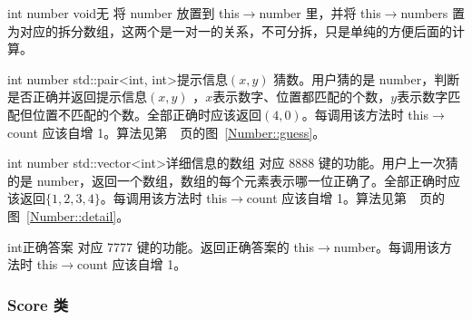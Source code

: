 

{int number}
{void}{无}
{将 number 放置到 this$\to$number 里，并将 this$\to$numbers 置为对应的拆分数组，这两个是一对一的关系，不可分拆，只是单纯的方便后面的计算。}

{int number}
{std::pair<int, int>}{提示信息$(x,y)$}
{猜数。用户猜的是 number，判断是否正确并返回提示信息$(x,y)$ ，$x$表示数字、位置都匹配的个数，$y$表示数字匹配但位置不匹配的个数。全部正确时应该返回$(4,0)$。每调用该方法时 this$\to$count 应该自增 1。算法见第~\pageref{Number::guess}~页的图~\ref{Number::guess}。}

{int number}
{std::vector<int>}{详细信息的数组}
{对应 8888 键的功能。用户上一次猜的是 number，返回一个数组，数组的每个元素表示哪一位正确了。全部正确时应该返回$\{1,2,3,4\}$。每调用该方法时 this$\to$count 应该自增 1。算法见第~\pageref{Number::detail}~页的图~\ref{Number::detail}。}

{}
{int}{正确答案}
{对应 7777 键的功能。返回正确答案的 this$\to$number。每调用该方法时 this$\to$count 应该自增 1。}

\subsubsection{Score 类}

